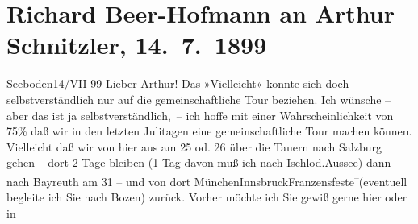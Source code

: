 

         
         \renewcommand{\erwaehntePersonen}{Personen: Richard Beer-Hofmann, Gustav Schwarzkopf}
         \renewcommand{\erwaehnteOrte}{Orte: Bad Aussee, Bad Ischl, Bayreuth, Bozen, Franzensfeste, Hohe Tauern, Innsbruck, Millstatt, München, Salzburg, Seeboden, Velden am Wörthersee}
         \renewcommand{\erwaehnteWerke}{Werke: Der Tod Georgs}
               \section[Richard Beer-Hofmann an Arthur Schnitzler, 14. 7. 1899]{ Richard Beer-Hofmann an Arthur Schnitzler, 14. 7. 1899}\nopagebreak{}\rehead{ }\begin{ledgroupsized}[t]{13cm}\normalsize\beginnumbering{} \toendnotes[C]{\smallbreak\pagebreak[2]} 
\toendnotes[C]{\smallbreak}\pstart
           \centering{}{\pb}Seeboden14/VII 99\pend
           \pstart
           Lieber Arthur! Das »Vielleicht« konnte sich doch selbstverständlich
               nur auf die gemeinschaftliche Tour beziehen. Ich wünsche – aber das ist ja
               selbstverständlich, – ich hoffe mit einer Wahrscheinlichkeit von 75{\%} daß wir in den letzten Julitagen eine gemeinschaftliche
               Tour machen können. Vielleicht daß wir von hier aus {\pb}am 25 od.
                  26 über die Tauern nach Salzburg gehen – dort 2 Tage bleiben (1 Tag davon muß ich
               nach Ischl\introOben{}od.\introOben{}{ }Aussee) dann nach Bayreuth am 31 – und von dort MünchenInnsbruckFranzensfeste\substVorne{}\textsuperscript{–}\substDazwischen{}(\substHinten{}eventuell begleite ich Sie nach Bozen\introOben{})\introOben{} zurück. Vorher möchte ich Sie gewiß gerne hier oder in

\end{ledgroupsized}
